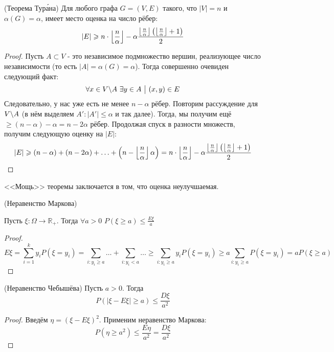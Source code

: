 \begin{theorem} (Теорема Тур\'{а}на)
	Для любого графа $G = (V, E)$ такого, что $|V| = n$ и $\alpha(G) = \alpha$, имеет место оценка на число рёбер:
	\[
		|E| \geqslant n \cdot \left\lfloor \frac{n}{\alpha} \right\rfloor - \alpha \frac{\left\lfloor \frac{n}{\alpha} \right\rfloor\left(\left\lfloor \frac{n}{\alpha} \right\rfloor + 1\right)}{2}
	\]
\end{theorem}

\begin{proof}
	Пусть $A \subset V$ - это независимое подмножество вершин, реализующее число независимости (то есть $|A| = \alpha(G) = \alpha$). Тогда совершенно очевиден следующий факт:
	\[
		\forall x \in V \backslash A\ \exists y \in A \ \big|\  (x, y) \in E
	\]
	Следовательно, у нас уже есть не менее $n - \alpha$ рёбер. Повторим рассуждение для $V \backslash A$ (в нём выделяем $A' \colon |A'| \le \alpha$ и так далее). Тогда, мы получим ещё $\ge (n - \alpha) - \alpha = n - 2\alpha$ рёбер. Продолжая спуск в разности множеств, получим следующую оценку на $|E|$:
	\[
		|E| \geqslant (n - \alpha) + (n - 2\alpha) + \ldots + \left(n - \left\lfloor \frac{n}{\alpha} \right\rfloor\alpha\right) = n \cdot \left\lfloor \frac{n}{\alpha} \right\rfloor - \alpha \frac{\left\lfloor \frac{n}{\alpha} \right\rfloor\left(\left\lfloor \frac{n}{\alpha} \right\rfloor + 1\right)}{2}
	\]
\end{proof}

\begin{note}
	<<Мощь>> теоремы заключается в том, что оценка неулучшаемая.
\end{note}

\begin{theorem}(Неравенство Маркова)

Пусть $\xi: \Omega \to \mathbb{R}_+$. Тогда $\forall a>0$ $P(\xi \geq a) \leq \frac{E\xi}{a}$
\end{theorem}

\begin{proof}

\[E\xi = \sum_{i = 1}^{k}y_{i}P(\xi = y_i) = \sum_{i: y_i \geq a}\dots + \sum_{i: y_i < a}\dots \geq \sum_{i: y_i \geq a}y_{i}P(\xi = y_i) \geq a\sum_{i: y_i \geq a}P(\xi = y_i)=aP(\xi \geq a)\]

\end{proof}

\begin{theorem}(Неравенство Чебышёва)
Пусть $a > 0$. Тогда \[
P(|\xi - E\xi| \geq a) \leq \frac{D\xi}{a^2}
\]

\end{theorem}

\begin{proof}
    Введём $\eta = (\xi - E\xi)^2$. Применим неравенство Маркова:
    \[
    P(\eta \geq a^2) \leq \frac{E\eta}{a^2} = \frac{D\xi}{a^2}
    \]
\end{proof}

